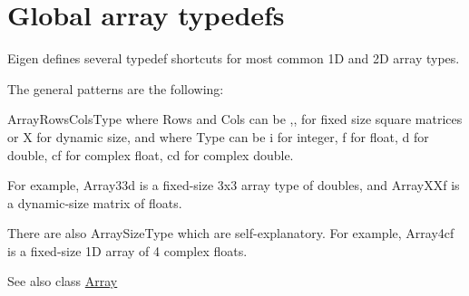 \hypertarget{group__arraytypedefs}{}\section{Global array typedefs}
\label{group__arraytypedefs}
Eigen defines several typedef shortcuts for most common 1D and 2D array types.

The general patterns are the following\+:

{\ttfamily Array\+Rows\+Cols\+Type} where {\ttfamily Rows} and {\ttfamily Cols} can be {},{},{} for fixed size square matrices or {\ttfamily X} for dynamic size, and where {\ttfamily Type} can be {\ttfamily i} for integer, {\ttfamily f} for float, {\ttfamily d} for double, {\ttfamily cf} for complex float, {\ttfamily cd} for complex double.

For example, {\ttfamily Array33d} is a fixed-\/size 3x3 array type of doubles, and {\ttfamily Array\+X\+Xf} is a dynamic-\/size matrix of floats.

There are also {\ttfamily Array\+Size\+Type} which are self-\/explanatory. For example, {\ttfamily Array4cf} is a fixed-\/size 1D array of 4 complex floats.

\begin{DoxySeeAlso}{See also}
class \mbox{\hyperlink{class_eigen_1_1_array}{Array}} 
\end{DoxySeeAlso}
